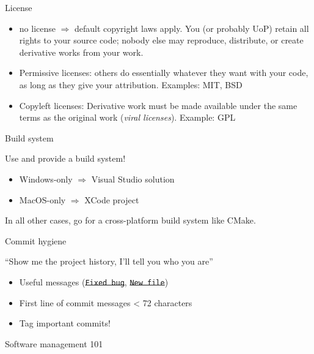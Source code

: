 \documentclass[compress]{beamer}
\begin{document}
\begin{frame}{License}
    \begin{itemize}
        \item {\Medium no license} $\Rightarrow$ default copyright laws apply.
            You (or probably UoP) retain all rights to your source code; nobody else may
            reproduce, distribute, or create derivative works from your work.
        \item {\Medium Permissive licenses}: others do essentially whatever they
            want with your code, as long as they give your attribution.
            Examples: MIT, BSD
        \item {\Medium Copyleft licenses}: Derivative work must be made
            available under the same terms as the original work (\emph{viral
            licenses}). Example: GPL
    \end{itemize}

    \centering



\end{frame}

\begin{frame}{Build system}

    Use and provide a build system!

    \begin{itemize}
        \item Windows-only $\Rightarrow$ Visual Studio solution
        \item MacOS-only $\Rightarrow$ XCode project
    \end{itemize}

    In all other cases, go for a cross-platform build system like {\Medium
    CMake}.
\end{frame}

\begin{frame}{Commit hygiene}
    \centering

    {\Medium ``Show me the project history, I'll tell you who you are''}

    \begin{itemize}
        \item Useful messages (\sout{\texttt{Fixed bug}}, \sout{\texttt{New
            file}})
        \item First line of commit messages < 72 characters
        \item Tag important commits!
    \end{itemize}
\end{frame}

\begin{frame}{Software management 101}

\end{frame}
\end{document}
